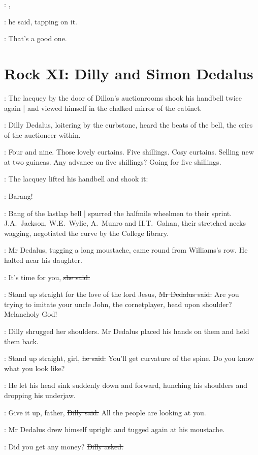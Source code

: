 \shopman:
,

:
he said,
tapping on it.

\shopman:
That's a good one.


\section*{Rock XI: Dilly and Simon Dedalus}


:
The lacquey by the door of Dillon's auctionrooms
shook his handbell
twice again |
and viewed himself in the chalked mirror of the cabinet.

:
Dilly Dedalus,
loitering by the curbstone,
heard the beats of the bell,
the cries of the auctioneer within.

\auctioneer:
Four and nine.
Those lovely curtains.
Five shillings.
Cosy curtains.
Selling new at two guineas.
Any advance on five shillings?
Going for five shillings.

:
The lacquey lifted his handbell and shook it:

\bell:
Barang!%

:
Bang of the lastlap bell |
spurred the halfmile wheelmen to their sprint.
J.A.~Jackson,
W.E.~Wylie,
A.~Munro
and H.T.~Gahan,
their stretched necks wagging,
negotiated the curve by the College library.

:
Mr Dedalus,
tugging a long moustache,
came round from Williams's row.
He halted near his daughter.

\dilly:
It's time for you,
\sout{she said.}

\simon:
Stand up straight for the love of the lord Jesus,
\sout{Mr Dedalus said.}
Are you trying to imitate your uncle John,
the cornetplayer,
head upon shoulder?
Melancholy God!

:
Dilly shrugged her shoulders.
Mr Dedalus placed his hands on them
and held them back.

\simon:
Stand up straight, girl,
\sout{he said.}
You'll get curvature of the spine.
Do you know what you look like?

:
He let his head sink suddenly down and forward,
hunching his shoulders and dropping his underjaw.

\dilly:
Give it up, father,
\sout{Dilly said.}
All the people are looking at you.

:
Mr Dedalus drew himself upright
and tugged again at his moustache.

\dilly:
Did you get any money?
\sout{Dilly asked.}

